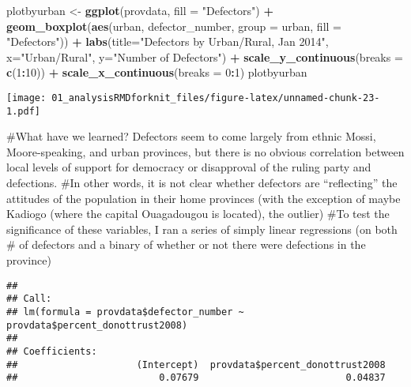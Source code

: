 \documentclass[]{article}
\newenvironment{Shaded}{\begin{snugshade}}{\end{snugshade}}
\newcommand{\DataTypeTok}[1]{\textcolor[rgb]{0.13,0.29,0.53}{#1}}
\newcommand{\DecValTok}[1]{\textcolor[rgb]{0.00,0.00,0.81}{#1}}
\newcommand{\KeywordTok}[1]{\textcolor[rgb]{0.13,0.29,0.53}{\textbf{#1}}}
\newcommand{\NormalTok}[1]{#1}
\newcommand{\OperatorTok}[1]{\textcolor[rgb]{0.81,0.36,0.00}{\textbf{#1}}}
\newcommand{\StringTok}[1]{\textcolor[rgb]{0.31,0.60,0.02}{#1}}
\begin{document}
\begin{Shaded}
\begin{Highlighting}[]
\NormalTok{plotbyurban <{-}}\StringTok{ }\KeywordTok{ggplot}\NormalTok{(provdata, }\DataTypeTok{fill =} \StringTok{"Defectors"}\NormalTok{) }\OperatorTok{+}\StringTok{ }\KeywordTok{geom\_boxplot}\NormalTok{(}\KeywordTok{aes}\NormalTok{(urban, defector\_number, }\DataTypeTok{group =}\NormalTok{ urban, }\DataTypeTok{fill =} \StringTok{"Defectors"}\NormalTok{)) }\OperatorTok{+}\StringTok{ }\KeywordTok{labs}\NormalTok{(}\DataTypeTok{title=}\StringTok{"Defectors by Urban/Rural, Jan 2014"}\NormalTok{, }\DataTypeTok{x=}\StringTok{"Urban/Rural"}\NormalTok{, }\DataTypeTok{y=}\StringTok{"Number of Defectors"}\NormalTok{) }\OperatorTok{+}\StringTok{ }\KeywordTok{scale\_y\_continuous}\NormalTok{(}\DataTypeTok{breaks =} \KeywordTok{c}\NormalTok{(}\DecValTok{1}\OperatorTok{:}\DecValTok{10}\NormalTok{)) }\OperatorTok{+}\StringTok{ }\KeywordTok{scale\_x\_continuous}\NormalTok{(}\DataTypeTok{breaks =} \DecValTok{0}\OperatorTok{:}\DecValTok{1}\NormalTok{)}
\NormalTok{plotbyurban}
\end{Highlighting}
\end{Shaded}

\texttt{[image: 01\_analysisRMDforknit\_files/figure-latex/unnamed-chunk-23-1.pdf]}

\#What have we learned? Defectors seem to come largely from ethnic
Mossi, Moore-speaking, and urban provinces, but there is no obvious
correlation between local levels of support for democracy or disapproval
of the ruling party and defections. \#In other words, it is not clear
whether defectors are ``reflecting'' the attitudes of the population in
their home provinces (with the exception of maybe Kadiogo (where the
capital Ouagadougou is located), the outlier) \#To test the significance
of these variables, I ran a series of simply linear regressions (on both
\# of defectors and a binary of whether or not there were defections in
the province)

\begin{Shaded}
\end{Shaded}

\begin{verbatim}
## 
## Call:
## lm(formula = provdata$defector_number ~ provdata$percent_donottrust2008)
## 
## Coefficients:
##                     (Intercept)  provdata$percent_donottrust2008  
##                         0.07679                          0.04837
\end{verbatim}
\end{document}

